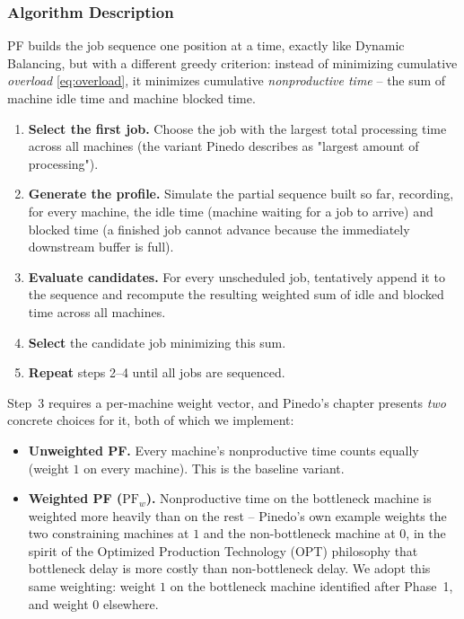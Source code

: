 \documentclass[11pt,a4paper]{article}
\begin{document}
\subsubsection*{Algorithm Description}

PF builds the job sequence one position at a time, exactly like Dynamic
Balancing, but with a different greedy criterion: instead of minimizing
cumulative \emph{overload} \eqref{eq:overload}, it minimizes cumulative
\emph{nonproductive time} -- the sum of machine idle time and machine
blocked time.

\begin{enumerate}
  \item \textbf{Select the first job.} Choose the job with the largest
    total processing time across all machines (the variant Pinedo
    describes as "largest amount of processing").
  \item \textbf{Generate the profile.} Simulate the partial sequence
    built so far, recording, for every machine, the idle time (machine
    waiting for a job to arrive) and blocked time (a finished job cannot
    advance because the immediately downstream buffer is full).
  \item \textbf{Evaluate candidates.} For every unscheduled job, tentatively
    append it to the sequence and recompute the resulting weighted sum of
    idle and blocked time across all machines.
  \item \textbf{Select} the candidate job minimizing this sum.
  \item \textbf{Repeat} steps 2--4 until all jobs are sequenced.
\end{enumerate}

\noindent Step~3 requires a per-machine weight vector, and Pinedo's
chapter presents \emph{two} concrete choices for it, both of which we
implement:

\begin{itemize}
  \item \textbf{Unweighted PF.} Every machine's nonproductive time counts
    equally (weight $1$ on every machine). This is the baseline variant.
  \item \textbf{Weighted PF ($\mathrm{PF}_w$).} Nonproductive time on the
    bottleneck machine is weighted more heavily than on the rest --
    Pinedo's own example weights the two constraining machines at $1$ and
    the non-bottleneck machine at $0$, in the spirit of the Optimized
    Production Technology (OPT) philosophy that bottleneck delay is more
    costly than non-bottleneck delay. We adopt this same weighting:
    weight $1$ on the bottleneck machine identified after Phase~1, and
    weight $0$ elsewhere.
\end{itemize}
\end{document}
